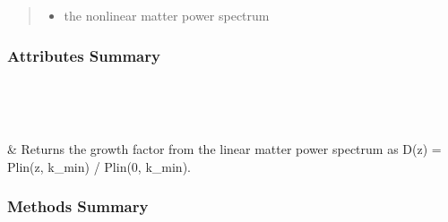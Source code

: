 \documentclass[letterpaper,10pt,english]{sphinxmanual}
\begin{document}
\begin{fulllineitems}
\begin{quote}
\begin{description}
\begin{itemize}
\item {} 
\sphinxAtStartPar
{} \textendash{} the nonlinear matter power spectrum

\end{itemize}

\end{description}\end{quote}
\subsubsection*{Attributes Summary}


\begin{savenotes}\sphinxatlongtablestart\begin{longtable}[c]{}
\hline

\endfirsthead

%
{}\\
\hline

\endhead

\hline
{}\\
\endfoot

\endlastfoot

\sphinxAtStartPar
{\hyperref[\detokenize{api/seyfert.cosmology.power_spectrum.PowerSpectrum:seyfert.cosmology.power_spectrum.PowerSpectrum.growth_factor_z}]{}}
&
\sphinxAtStartPar
Returns the growth factor from the linear matter power spectrum as D(z) = Plin(z, k\_min) / Plin(0, k\_min).
\\
\hline
\end{longtable}\sphinxatlongtableend\end{savenotes}
\subsubsection*{Methods Summary}


\begin{savenotes}\sphinxatlongtablestart\begin{longtable}[c]{}
\hline

\endfirsthead

%
{}\\
\hline


\end{longtable}
\end{savenotes}
\end{fulllineitems}
\end{document}
